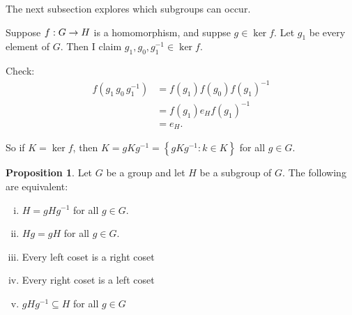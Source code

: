 \documentclass{article}
\theoremstyle{definition} \newtheorem*{definition}{Definition}
\newtheorem{proposition}[theorem]{Proposition}
\begin{document}
The next subsection explores which subgroups can occur.

Suppose $f : G \rightarrow H$ is a homomorphism, and suppse $g \in \ker f$. Let
$g_1$ be every element of $G$. Then I claim $g_1,g_0,g_1^{-1}\in \ker f$.

Check: \begin{align*} f(g_1\,g_0\,g_1^{-1}) &= f(g_1)f(g_0)f(g_1)^{-1}\\ &=
  f(g_1)e_Hf(g_1)^{-1} \\ &= e_H.  \end{align*}

So if $K=\ker f$, then $K=gKg^{-1}=\left\{ gKg^{-1} : k \in K \right\}$ for all
$g \in G.$\\

\begin{proposition} \label{prp:tfae} Let $G$ be a group and let $H$ be a
subgroup of $G$. The following are equivalent: \begin{enumerate}[(i)] \item
    $H=gHg^{-1}$ for all $g \in G$.  \item $Hg=gH$ for all $g \in G$.  \item
      Every left coset is a right coset \item Every right coset is a left coset
      \item $gHg^{-1} \subseteq H$ for all $g \in G$ \end{enumerate}
  \end{proposition}
\end{document}
